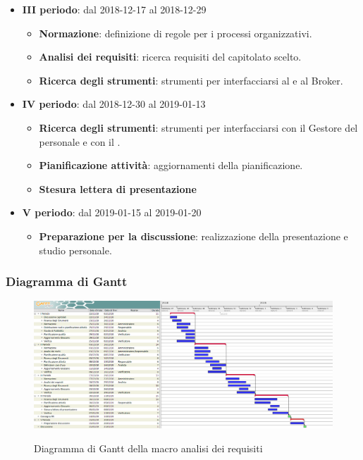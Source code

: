 \begin{itemize}
\begin{itemize}
			\end{itemize}
        	\item \textbf{III periodo}: dal 2018-12-17 al 2018-12-29
			\begin{itemize}
    	        \item \textbf{Normazione}: definizione di regole per i processi organizzativi.
    	        \item \textbf{Analisi dei requisiti}: ricerca requisiti del capitolato scelto.
       	        \item \textbf{Ricerca degli strumenti}: strumenti per interfacciarsi al  e al Broker.
        	\end{itemize}
        	\item \textbf{IV periodo}: dal 2018-12-30 al 2019-01-13
        	\begin{itemize}
       	        \item \textbf{Ricerca degli strumenti}: strumenti per interfacciarsi con il Gestore del personale e con il .
       	        \item \textbf{Pianificazione attività}: aggiornamenti della pianificazione.
       	        \item \textbf{Stesura lettera di presentazione}
        	\end{itemize}
        	\item \textbf{V periodo}: dal 2019-01-15 al 2019-01-20
        	\begin{itemize}
    	        \item \textbf{Preparazione per la discussione}: realizzazione della presentazione e studio personale.
        	\end{itemize}
		\end{itemize}

        \begin{landscape}
			\subsubsection{Diagramma di Gantt}
			\begin{figure}[H]
					\centering
					\includegraphics[scale=0.4]{img/Analisi_dei_requisiti.png}\\
					\caption{Diagramma di Gantt della macro analisi dei requisiti}
			\end{figure}
		\end{landscape}

